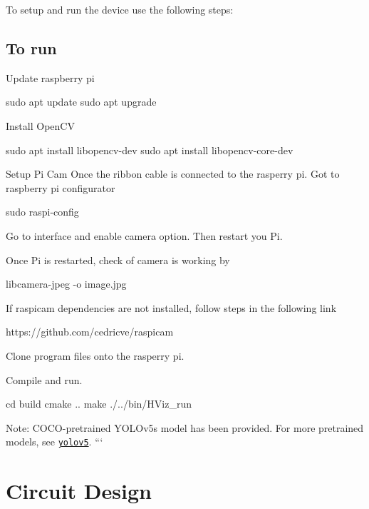 To setup and run the device use the following steps\+:



\subsection*{To run}


\begin{DoxyEnumerate}
\item Update raspberry pi 
\begin{DoxyCode}
sudo apt update
sudo apt upgrade
\end{DoxyCode}

\item Install Open\+CV 
\begin{DoxyCode}
sudo apt install libopencv-dev
sudo apt install libopencv-core-dev
\end{DoxyCode}

\item Setup Pi Cam Once the ribbon cable is connected to the rasperry pi. Got to raspberry pi configurator 
\begin{DoxyCode}
sudo raspi-config
\end{DoxyCode}

\item Go to interface and enable camera option. Then restart you Pi.
\item Once Pi is restarted, check of camera is working by 
\begin{DoxyCode}
libcamera-jpeg -o image.jpg
\end{DoxyCode}

\item If raspicam dependencies are not installed, follow steps in the following link 
\begin{DoxyCode}
https://github.com/cedricve/raspicam
\end{DoxyCode}

\item Clone program files onto the rasperry pi.
\item Compile and run.
\end{DoxyEnumerate}


\begin{DoxyCode}
cd build
cmake ..
make
./../bin/HViz\_run
\end{DoxyCode}


Note\+: C\+O\+C\+O-\/pretrained Y\+O\+L\+Ov5s model has been provided. For more pretrained models, see \href{https://github.com/ultralytics/yolov5}{\tt yolov5}. ``` \section*{Circuit Design}

 